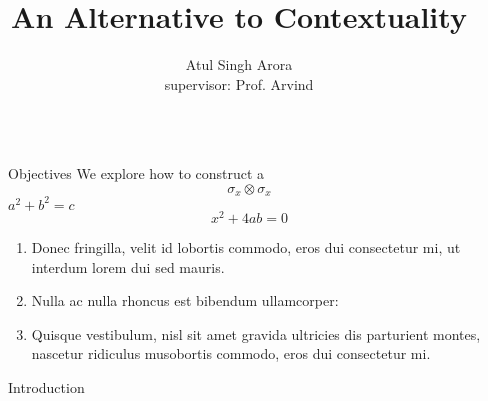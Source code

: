 \documentclass[final,hyperref={pdfpagelabels=false}]{beamer}
\title{\huge An Alternative to Contextuality} %
\author{Atul Singh Arora \\ \small supervisor: Prof. Arvind} %
\institute{Indian Institute of Science Education \& Research (IISER), Mohali} %
\begin{document}



\begin{frame}[t] %

  \begin{columns}[t] %

    \begin{column}{.01\textwidth}\end{column} %
    \begin{column}{.32\textwidth} %

      \begin{block}{Objectives}
        We explore how to construct a \[ \sigma_x \otimes \sigma_x \]
        $a^2 + b^2 =c$
        \begin{equation}
          x^2 + 4ab=0
        \end{equation}

        \begin{enumerate}
        \item Donec fringilla, velit id lobortis commodo, eros dui
          consectetur mi, ut interdum lorem dui sed mauris.
        \item Nulla ac nulla rhoncus est bibendum ullamcorper:
        \item Quisque vestibulum, nisl sit amet gravida ultricies dis
          parturient montes, nascetur ridiculus musobortis commodo,
          eros dui consectetur mi.
        \end{enumerate}

      \end{block}

            
      \begin{block}{Introduction}


\end{block}
\end{column}
\end{columns}
\end{frame}
\end{document}
